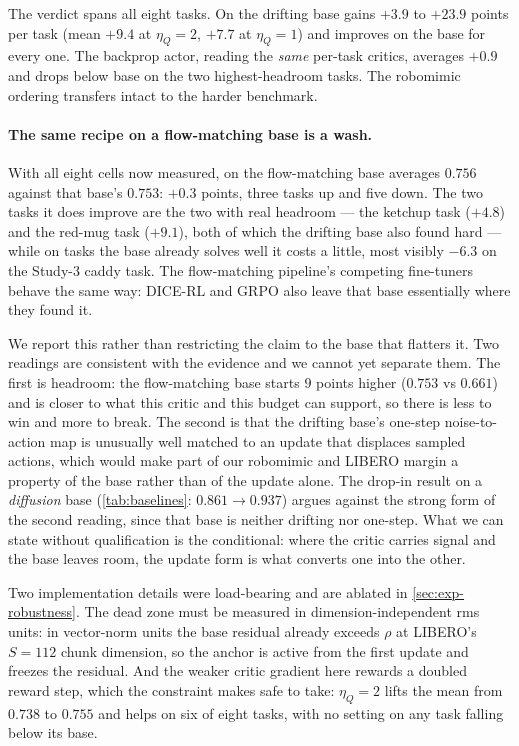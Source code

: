 The verdict spans all eight tasks. On the drifting base \method{} gains
$+3.9$ to $+23.9$ points per task (mean $+9.4$ at $\eta_Q{=}2$, $+7.7$ at
$\eta_Q{=}1$) and improves on the base for every one. The backprop actor,
reading the \emph{same} per-task critics, averages $+0.9$ and drops below
base on the two highest-headroom tasks. The robomimic ordering transfers
intact to the harder benchmark.

\paragraph{The same recipe on a flow-matching base is a wash.} With all
eight cells now measured, \method{} on the flow-matching base averages
$0.756$ against that base's $0.753$: $+0.3$ points, three tasks up and five
down. The two tasks it does improve are the two with real headroom --- the
ketchup task ($+4.8$) and the red-mug task ($+9.1$), both of which the
drifting base also found hard --- while on tasks the base already solves
well it costs a little, most visibly $-6.3$ on the Study-3 caddy task. The
flow-matching pipeline's competing fine-tuners behave the same way:
DICE-RL and GRPO also leave that base essentially where they found it.

We report this rather than restricting the claim to the base that flatters
it. Two readings are consistent with the evidence and we cannot yet separate
them. The first is headroom: the flow-matching base starts $9$ points higher
($0.753$ vs $0.661$) and is closer to what this critic and this budget can
support, so there is less to win and more to break. The second is that the
drifting base's one-step noise-to-action map is unusually well matched to an
update that displaces sampled actions, which would make part of our
robomimic and LIBERO margin a property of the base rather than of the update
alone. The drop-in result on a \emph{diffusion} base
(\cref{tab:baselines}: $0.861 \to 0.937$) argues against the strong form of
the second reading, since that base is neither drifting nor one-step. What
we can state without qualification is the conditional: where the critic
carries signal and the base leaves room, the update form is what converts
one into the other.

Two implementation details were load-bearing and are ablated in
\cref{sec:exp-robustness}. The dead zone must be measured in
dimension-independent rms units: in vector-norm units the base residual
already exceeds $\rho$ at LIBERO's $S{=}112$ chunk dimension, so the anchor
is active from the first update and freezes the residual. And the weaker
critic gradient here rewards a doubled reward step, which the constraint
makes safe to take: $\eta_Q{=}2$ lifts the mean from $0.738$ to $0.755$ and
helps on six of eight tasks, with no setting on any task falling below its
base.

